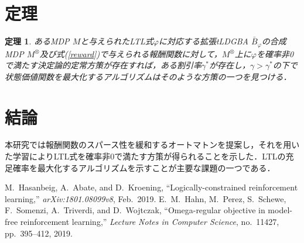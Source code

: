 \documentclass[a4j,9pt,twocolumn]{jsarticle}
\newtheorem{theorem}{定理}
\theoremstyle{definition}
\begin{document}
\section{定理}
\begin{theorem}
  あるMDP $M$と与えられたLTL式$\varphi$に対応する拡張tLDGBA $\bar{B}_{\varphi}$の合成MDP $M^{\otimes}$及び式(\ref{reward})で与えられる報酬関数に対して，$M^{\otimes}$上に$\varphi$を確率非0で満たす決定論的定常方策が存在すれば，ある割引率$\gamma^{\ast}$が存在し，$\gamma>\gamma^{\ast}$の下で状態価値関数を最大化するアルゴリズムはそのような方策の一つを見つける．
\end{theorem}

\section{結論}
本研究では報酬関数のスパース性を緩和するオートマトンを提案し，それを用いた学習によりLTL式を確率非0で満たす方策が得られることを示した．LTLの充足確率を最大化するアルゴリズムを示すことが主要な課題の一つである．

\begin{thebibliography}{9}
  M.\ Hasanbeig, A.\ Abate, and D.\ Kroening,
  ``Logically-constrained reinforcement learning,'' \textit{arXiv:1801.08099v8}, Feb.\ 2019.
  E.\ M.\ Hahn, M.\ Perez, S.\ Schewe, F.\ Somenzi, A.\ Triverdi, and D.\ Wojtczak,
  ``Omega-regular objective in model-free reinforcement learning,''
  \textit{Lecture Notes in Computer Science}, no.\ 11427, pp.\ 395--412, 2019.
\end{thebibliography}
\newpage
\pagebreak
\end{document}
